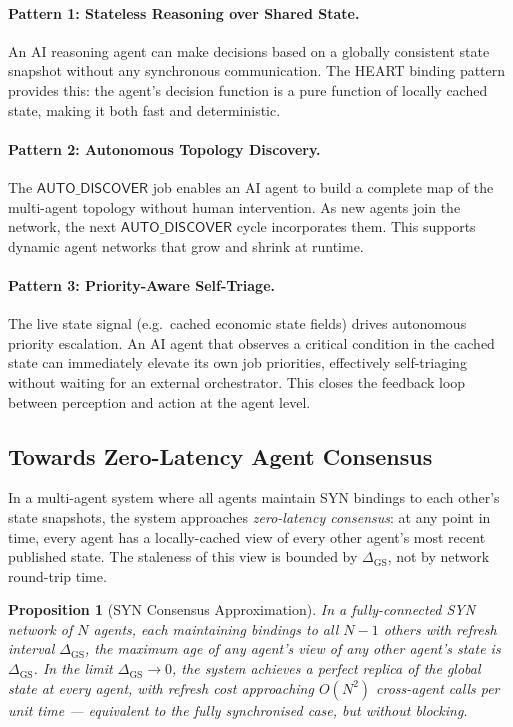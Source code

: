 \documentclass[12pt]{article}
\newtheorem{proposition}[theorem]{Proposition}
\begin{document}
\paragraph{Pattern 1: Stateless Reasoning over Shared State.}
An AI reasoning agent can make decisions based on a globally consistent state
snapshot without any synchronous communication.  The HEART binding pattern
provides this: the agent's decision function is a pure function of locally
cached state, making it both fast and deterministic.

\paragraph{Pattern 2: Autonomous Topology Discovery.}
The $\mathsf{AUTO\_DISCOVER}$ job enables an AI agent to build a complete map
of the multi-agent topology without human intervention.  As new agents join the
network, the next $\mathsf{AUTO\_DISCOVER}$ cycle incorporates them.  This
supports dynamic agent networks that grow and shrink at runtime.

\paragraph{Pattern 3: Priority-Aware Self-Triage.}
The live state signal (e.g.\ cached economic state fields) drives autonomous
priority escalation.  An AI agent that observes a critical condition in the
cached state can immediately elevate its own job priorities, effectively
self-triaging without waiting for an external orchestrator.  This closes the
feedback loop between perception and action at the agent level.

\subsection{Towards Zero-Latency Agent Consensus}

In a multi-agent system where all agents maintain SYN bindings to each other's
state snapshots, the system approaches \emph{zero-latency consensus}: at any
point in time, every agent has a locally-cached view of every other agent's
most recent published state.  The staleness of this view is bounded by
$\Delta_\text{GS}$, not by network round-trip time.

\begin{proposition}[SYN Consensus Approximation]
  In a fully-connected SYN network of $N$ agents, each maintaining bindings
  to all $N-1$ others with refresh interval $\Delta_\text{GS}$, the maximum
  age of any agent's view of any other agent's state is $\Delta_\text{GS}$.
  In the limit $\Delta_\text{GS} \to 0$, the system achieves a perfect
  replica of the global state at every agent, with refresh cost approaching
  $O(N^2)$ cross-agent calls per unit time — equivalent to the fully
  synchronised case, but without blocking.
\end{proposition}
\end{document}
